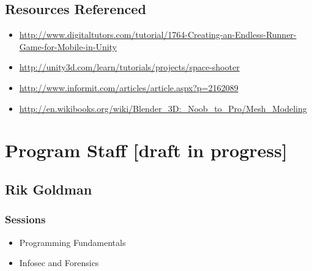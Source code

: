 \documentclass[letterpaper,10pt,english]{sphinxmanual}
\begin{document}
\section{Resources Referenced}
\label{gamedev:resources-referenced}\begin{itemize}
\item {} 
\href{http://www.digitaltutors.com/tutorial/1764-Creating-an-Endless-Runner-Game-for-Mobile-in-Unity}{http://www.digitaltutors.com/tutorial/1764-Creating-an-Endless-Runner-Game-for-Mobile-in-Unity}

\item {} 
\href{http://unity3d.com/learn/tutorials/projects/space-shooter}{http://unity3d.com/learn/tutorials/projects/space-shooter}

\item {} 
\href{http://www.informit.com/articles/article.aspx?p=2162089}{http://www.informit.com/articles/article.aspx?p=2162089}

\item {} 
\href{http://en.wikibooks.org/wiki/Blender\_3D:\_Noob\_to\_Pro/Mesh\_Modeling}{http://en.wikibooks.org/wiki/Blender\_3D:\_Noob\_to\_Pro/Mesh\_Modeling}

\end{itemize}


\chapter{Program Staff {[}draft in progress{]}}
\label{faculty::doc}\label{faculty:program-staff-draft-in-progress}\label{faculty:index-0}

\section{Rik Goldman}
\label{faculty:rik-goldman}

\subsection{Sessions}
\label{faculty:sessions}\begin{itemize}
\item {} 
Programming Fundamentals

\item {} 
Infosec and Forensics

\end{itemize}
\end{document}
